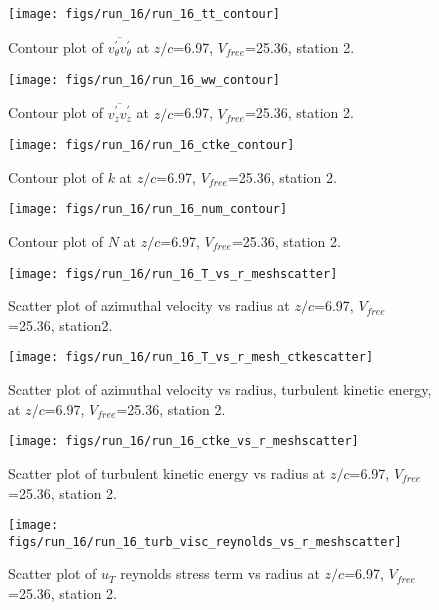 \begin{figure}[H]
\centering
\texttt{[image: figs/run\_16/run\_16\_tt\_contour]}
\caption{Contour plot of $\overline{v_{\theta}^{\prime} v_{\theta}^{\prime}}$ at $z/c$=6.97, $V_{free}$=25.36, station 2.}
\end{figure}


\begin{figure}[H]
\centering
\texttt{[image: figs/run\_16/run\_16\_ww\_contour]}
\caption{Contour plot of $\overline{v_{z}^{\prime} v_{z}^{\prime}}$ at $z/c$=6.97, $V_{free}$=25.36, station 2.}
\end{figure}


\begin{figure}[H]
\centering
\texttt{[image: figs/run\_16/run\_16\_ctke\_contour]}
\caption{Contour plot of $k$ at $z/c$=6.97, $V_{free}$=25.36, station 2.}
\end{figure}


\begin{figure}[H]
\centering
\texttt{[image: figs/run\_16/run\_16\_num\_contour]}
\caption{Contour plot of $N$ at $z/c$=6.97, $V_{free}$=25.36, station 2.}
\end{figure}


\begin{figure}[H]
\centering
\texttt{[image: figs/run\_16/run\_16\_T\_vs\_r\_meshscatter]}
\caption{Scatter plot of azimuthal velocity vs radius at $z/c$=6.97, $V_{free}$=25.36, station2.}
\end{figure}


\begin{figure}[H]
\centering
\texttt{[image: figs/run\_16/run\_16\_T\_vs\_r\_mesh\_ctkescatter]}
\caption{Scatter plot of azimuthal velocity vs radius, turbulent kinetic energy, at $z/c$=6.97, $V_{free}$=25.36, station 2.}
\end{figure}


\begin{figure}[H]
\centering
\texttt{[image: figs/run\_16/run\_16\_ctke\_vs\_r\_meshscatter]}
\caption{Scatter plot of turbulent kinetic energy vs radius at $z/c$=6.97, $V_{free}$=25.36, station 2.}
\end{figure}


\begin{figure}[H]
\centering
\texttt{[image: figs/run\_16/run\_16\_turb\_visc\_reynolds\_vs\_r\_meshscatter]}
\caption{Scatter plot of $
u_T$ reynolds stress term vs radius at $z/c$=6.97, $V_{free}$=25.36, station 2.}
\end{figure}


